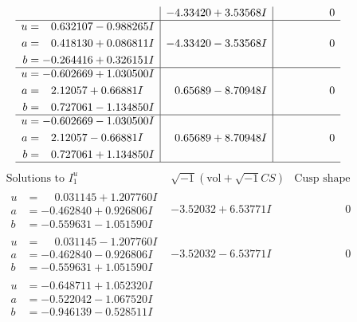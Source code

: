 \documentclass[1p]{elsarticle_modified}
\theoremstyle{definition}
\newcommand{\I}{\sqrt{-1}}
\begin{document}
$$\begin{array}{c|c|c}
 & -4.33420 + 3.53568 I & \phantom{-0.000000 } 0 \\ \hline\begin{aligned}
u &= \phantom{-}0.632107 - 0.988265 I \\
a &= \phantom{-}0.418130 + 0.086811 I \\
b &= -0.264416 + 0.326151 I\end{aligned}
 & -4.33420 - 3.53568 I & \phantom{-0.000000 } 0 \\ \hline\begin{aligned}
u &= -0.602669 + 1.030500 I \\
a &= \phantom{-}2.12057 + 0.66881 I \\
b &= \phantom{-}0.727061 - 1.134850 I\end{aligned}
 & \phantom{-}0.65689 - 8.70948 I & \phantom{-0.000000 } 0 \\ \hline\begin{aligned}
u &= -0.602669 - 1.030500 I \\
a &= \phantom{-}2.12057 - 0.66881 I \\
b &= \phantom{-}0.727061 + 1.134850 I\end{aligned}
 & \phantom{-}0.65689 + 8.70948 I & \phantom{-0.000000 } 0\\
 \hline 
 \end{array}$$\newpage$$\begin{array}{c|c|c}  
\text{Solutions to }I^u_{1}& \I (\text{vol} + \sqrt{-1}CS) & \text{Cusp shape}\\
 \hline 
\begin{aligned}
u &= \phantom{-}0.031145 + 1.207760 I \\
a &= -0.462840 + 0.926806 I \\
b &= -0.559631 - 1.051590 I\end{aligned}
 & -3.52032 + 6.53771 I & \phantom{-0.000000 } 0 \\ \hline\begin{aligned}
u &= \phantom{-}0.031145 - 1.207760 I \\
a &= -0.462840 - 0.926806 I \\
b &= -0.559631 + 1.051590 I\end{aligned}
 & -3.52032 - 6.53771 I & \phantom{-0.000000 } 0 \\ \hline\begin{aligned}
u &= -0.648711 + 1.052320 I \\
a &= -0.522042 - 1.067520 I \\
b &= -0.946139 - 0.528511 I\end{aligned}

\end{array}$$
\end{document}
